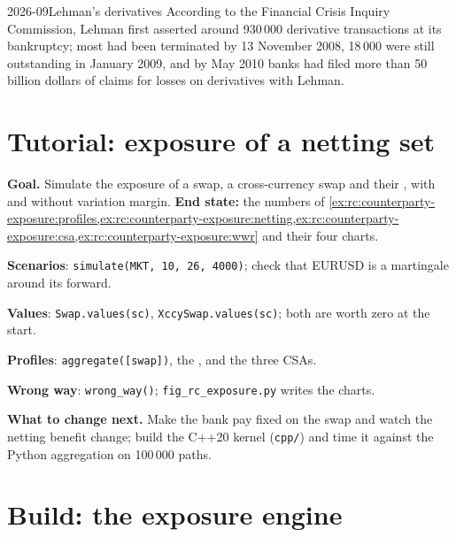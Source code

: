 \begin{dated}{2026-09}{Lehman's derivatives}\label{dat:rc:counterparty-exposure:lehman}
According to the Financial Crisis Inquiry Commission, Lehman first asserted around
930\,000 derivative transactions at its bankruptcy; most had been terminated by
13 November 2008, 18\,000 were still outstanding in January 2009, and by May 2010 banks had
filed more than 50 billion dollars of claims for losses on derivatives with Lehman.
\end{dated}

\section{Tutorial: exposure of a netting set}\label{tut:rc:counterparty-exposure:tutorial}

\begin{tutorial}
\textbf{Goal.} Simulate the exposure of a swap, a cross-currency swap and their ,
with and without variation margin. \textbf{End state:} the numbers of
\cref{ex:rc:counterparty-exposure:profiles,ex:rc:counterparty-exposure:netting,ex:rc:counterparty-exposure:csa,ex:rc:counterparty-exposure:wwr}
and their four charts.
\begin{tutsteps}
\item \textbf{Scenarios}: \texttt{simulate(MKT, 10, 26, 4000)}; check that EURUSD is a
martingale around its forward.
\item \textbf{Values}: \texttt{Swap.values(sc)}, \texttt{XccySwap.values(sc)}; both
are worth zero at the start.
\item \textbf{Profiles}: \texttt{aggregate([swap])}, the , and the three CSAs.
\item \textbf{Wrong way}: \texttt{wrong\_way()}; \texttt{fig\_rc\_exposure.py} writes the charts.
\end{tutsteps}
\textbf{What to change next.} Make the bank pay fixed on the swap and watch the netting
benefit change; build the C++20 kernel (\texttt{cpp/}) and time it against the Python
aggregation on 100\,000 paths.
\end{tutorial}

\section{Build: the exposure engine}\label{bld:rc:counterparty-exposure:exposure}

